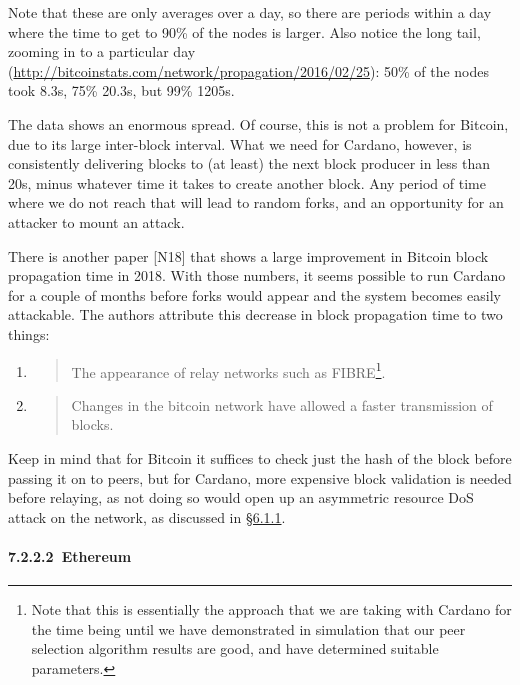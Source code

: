 \documentclass[11pt,a4paper]{article}
\begin{document}
Note that these are only averages over a day, so there are periods
within a day where the time to get to 90\% of the nodes is larger. Also
notice the long tail, zooming in to a particular day
(\href{http://bitcoinstats.com/network/propagation/2016/02/25}{{http://bitcoinstats.com/network/propagation/2016/02/25}}):
50\% of the nodes took 8.3s, 75\% 20.3s, but 99\% 1205s.

The data shows an enormous spread. Of course, this is not a problem for
Bitcoin, due to its large inter-block interval. What we need for
Cardano, however, is consistently delivering blocks to (at least) the
next block producer in less than 20s, minus whatever time it takes to
create another block. Any period of time where we do not reach that will
lead to random forks, and an opportunity for an attacker to mount an
attack.

There is another paper {[}N18{]} that shows a large improvement in
Bitcoin block propagation time in 2018. With those numbers, it seems
possible to run Cardano for a couple of months before forks would appear
and the system becomes easily attackable. The authors attribute this
decrease in block propagation time to two things:

\begin{enumerate}
\def\labelenumi{\arabic{enumi}.}
\item
  \begin{quote}
  The appearance of relay networks such as FIBRE\footnote{Note that this
    is essentially the approach that we are taking with Cardano for the
    time being until we have demonstrated in simulation that our peer
    selection algorithm results are good, and have determined suitable
    parameters.}.
  \end{quote}
\item
  \begin{quote}
  Changes in the bitcoin network have allowed a faster transmission of
  blocks.
  \end{quote}
\end{enumerate}

Keep in mind that for Bitcoin it suffices to check just the hash of the
block before passing it on to peers, but for Cardano, more expensive
block validation is needed before relaying, as not doing so would open
up an asymmetric resource DoS attack on the network, as discussed in
\protect\hyperlink{interleaving-transmission-and-validation}{{§6.1.1}}.

\hypertarget{ethereum}{%
\paragraph{​7.2.2.2​~Ethereum}\label{ethereum}}
\end{document}
